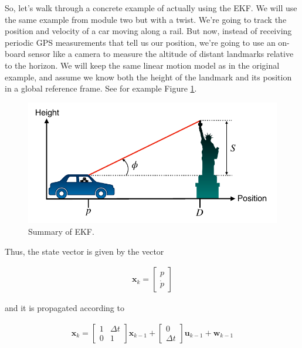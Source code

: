 So, let's walk through a concrete example of actually using the EKF. We will use the same example from
module two but with a twist. We're going to track the position and velocity of a car moving along a rail. But now, instead of receiving periodic GPS measurements
that tell us our position, we're going to use an on-board sensor like a camera to measure the altitude of distant
landmarks relative to the horizon. We will keep the same linear motion model
as in the original example, and assume we know both the height of the landmark and its position
in a global reference frame. See for example Figure \ref{kalman_7}.

\begin{figure}[!htb]
\begin{center}
\includegraphics[scale=0.280]{img/kalman_filter/kalman_7.jpeg}
\end{center}
\caption{Summary of EKF.}
\label{kalman_7}
\end{figure}

Thus, the state vector is given by the vector

\begin{eqnarray}
\mathbf{x}_k = 
\begin{bmatrix}
p \\
\dot{p}
\end{bmatrix}
\end{eqnarray}

and it is propagated according to

\begin{eqnarray}
\mathbf{x}_k = 
\begin{bmatrix}
1 & \Delta t \\
0 & 1
\end{bmatrix}
\mathbf{x}_{k-1} + 
\begin{bmatrix}
 0 \\
 \Delta t 
\end{bmatrix}
\mathbf{u}_{k-1} + \mathbf{w}_{k-1}
\end{eqnarray}

